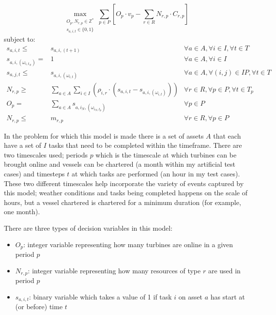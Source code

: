 \documentclass[a4paper,12pt]{article}
\begin{document}
\small
\begin{equation}
	\max_{\substack{O_p, N_{r,p} \in \mathbb{Z}^* \\
	s_{a,i,t} \in \{0, 1\}}} 
	\sum_{p \in P} [ O_p \cdot v_p - \sum_{r \in R} N_{r,p} \cdot C_{r,p} ]
\end{equation}
subject to:
\begin{align}		
s_{a,i,t} \leq& s_{a,i,(t+1)}											&	\forall a \in A, \forall i \in I, \forall t \in T				\\
s_{a,i,(\omega_{i,t_N})} =& 1											&	\forall a \in A, \forall i \in I						\\
s_{a,j,t} \leq& s_{a,i,(\omega_{i,t})}										&	\forall a \in A, \forall (i, j) \in IP, \forall t \in T 			\\
N_{r,p} \geq& \sum_{a \in A}\sum_{i\in I} (\rho_{i,r} \cdot (s_{a,i,t} - s_{a,i,(\omega_{i,t})}))	& 	\forall r \in R, \forall p \in P, \forall t \in T_p			\\
O_p =&  \sum_{a \in A} s_{a,i_N,(\omega_{i_N,t_p})}							& 	\forall p \in P 							\\
N_{r,p} \leq& m_{r,p}												& 	\forall r \in R, \forall p \in P
\end{align}
\normalsize

In the problem for which this model is made there is a set of assets $A$ that each have a set of $I$ tasks that need to be completed within the timeframe. There are two timescales used; periods $p$ which is the timescale at which turbines can be brought online and vessels can be chartered (a month within my artificial test cases) and timesteps $t$ at which tasks are performed (an hour in my test cases). These two different timescales help incorporate the variety of events captured by this model; weather conditions and tasks being completed happens on the scale of hours, but a vessel chartered is chartered for a minimum duration (for example, one month). 

There are three types of decision variables in this model: 

\begin{itemize}
\item $O_p$: integer variable representing how many turbines are online in a given period $p$
\item $N_{r,p}$: integer variable representing how many resources of type $r$ are used in period $p$
\item $s_{a,i,t}$: binary variable which takes a value of 1 if task $i$ on asset $a$ has start at (or before) time $t$
\end{itemize}
\end{document}
